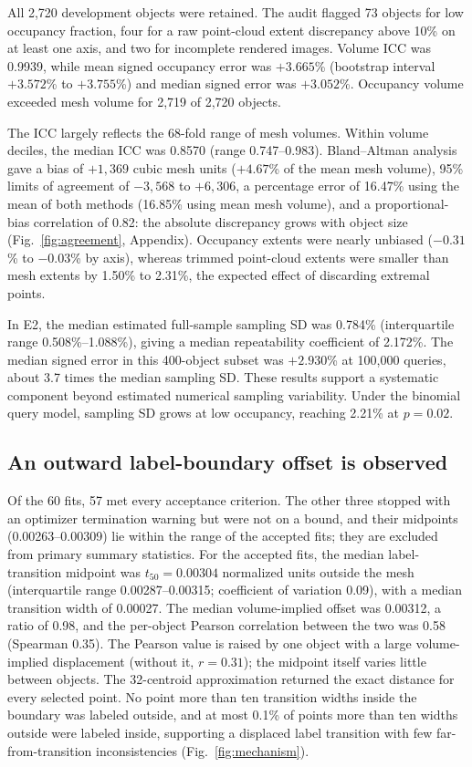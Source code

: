 \documentclass[journal]{IEEEtran}
\begin{document}
All 2,720 development objects were retained. The audit flagged 73 objects for low occupancy fraction, four for a raw point-cloud extent discrepancy above 10\% on at least one axis, and two for incomplete rendered images. Volume ICC was 0.9939, while mean signed occupancy error was $+3.665$\% (bootstrap interval $+3.572$\% to $+3.755$\%) and median signed error was $+3.052$\%. Occupancy volume exceeded mesh volume for 2,719 of 2,720 objects.

The ICC largely reflects the 68-fold range of mesh volumes. Within volume deciles, the median ICC was 0.8570 (range 0.747--0.983). Bland--Altman analysis gave a bias of $+1{,}369$ cubic mesh units ($+4.67$\% of the mean mesh volume), 95\% limits of agreement of $-3{,}568$ to $+6{,}306$, a percentage error of 16.47\% using the mean of both methods (16.85\% using mean mesh volume), and a proportional-bias correlation of 0.82: the absolute discrepancy grows with object size (Fig.~\ref{fig:agreement}, Appendix). Occupancy extents were nearly unbiased ($-0.31$\% to $-0.03$\% by axis), whereas trimmed point-cloud extents were smaller than mesh extents by 1.50\% to 2.31\%, the expected effect of discarding extremal points.

In E2, the median estimated full-sample sampling SD was 0.784\% (interquartile range 0.508\%--1.088\%), giving a median repeatability coefficient of 2.172\%. The median signed error in this 400-object subset was $+2.930$\% at 100,000 queries, about 3.7 times the median sampling SD. These results support a systematic component beyond estimated numerical sampling variability. Under the binomial query model, sampling SD grows at low occupancy, reaching 2.21\% at $p=0.02$.


\subsection{An outward label-boundary offset is observed}\label{sec:boundary}

Of the 60 fits, 57 met every acceptance criterion. The other three stopped with an optimizer termination warning but were not on a bound, and their midpoints (0.00263--0.00309) lie within the range of the accepted fits; they are excluded from primary summary statistics. For the accepted fits, the median label-transition midpoint was $t_{50}=0.00304$ normalized units outside the mesh (interquartile range 0.00287--0.00315; coefficient of variation 0.09), with a median transition width of 0.00027. The median volume-implied offset was 0.00312, a ratio of 0.98, and the per-object Pearson correlation between the two was 0.58 (Spearman 0.35). The Pearson value is raised by one object with a large volume-implied displacement (without it, $r=0.31$); the midpoint itself varies little between objects. The 32-centroid approximation returned the exact distance for every selected point. No point more than ten transition widths inside the boundary was labeled outside, and at most 0.1\% of points more than ten widths outside were labeled inside, supporting a displaced label transition with few far-from-transition inconsistencies (Fig.~\ref{fig:mechanism}).
\end{document}
